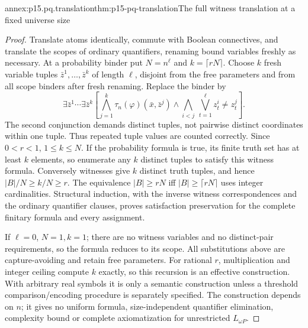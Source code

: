 \begin{annexitem}{annex:p15.pq.translation}{thm:p15-pq-translation}{The full witness translation at a fixed universe size}
\begin{proof}
Translate atoms identically, commute with Boolean connectives, and
translate the scopes of ordinary quantifiers, renaming bound variables
freshly as necessary. At a probability binder put \(N=n^\ell\) and
\(k=\lceil rN\rceil\). Choose \(k\) fresh variable tuples
\(\bar z^1,\ldots,\bar z^k\) of length \(\ell\), disjoint from the
free parameters and from all scope binders after fresh renaming.
Replace the binder by
\[
 \exists\bar z^1\cdots\exists\bar z^k
 \left[
  \bigwedge_{j=1}^k\tau_n(\varphi)(\bar x,\bar z^j)
  \land
  \bigwedge_{i<j}\ \bigvee_{t=1}^{\ell}z_t^i\ne z_t^j
 \right].
\]
The second conjunction demands distinct tuples, not pairwise distinct
coordinates within one tuple. Thus repeated tuple values are counted
correctly. Since \(0<r<1\), \(1\le k\le N\).
If the probability formula is true, its finite truth set has at least
\(k\) elements, so enumerate any \(k\) distinct tuples to satisfy this
witness formula. Conversely witnesses give \(k\) distinct truth tuples,
and hence \(|B|/N\ge k/N\ge r\). The equivalence
\(|B|\ge rN\) iff \(|B|\ge\lceil rN\rceil\) uses integer cardinalities.
Structural induction, with the inverse witness correspondences and
the ordinary quantifier clauses, proves satisfaction preservation for
the complete finitary formula and every assignment.

If \(\ell=0\), \(N=1,k=1\); there are no witness variables and no
distinct-pair requirements, so the formula reduces to its scope.
All substitutions above are capture-avoiding and retain free parameters.
For rational \(r\), multiplication and integer ceiling compute \(k\)
exactly, so this recursion is an effective construction. With arbitrary
real symbols it is only a semantic construction unless a threshold
comparison/encoding procedure is separately specified.
The construction depends on \(n\); it gives no uniform formula,
size-independent quantifier elimination, complexity bound or complete
axiomatization for unrestricted \(L_{\omega P}\).
\end{proof}
\end{annexitem}


